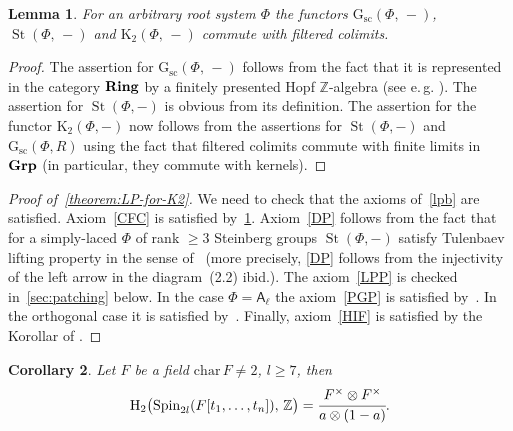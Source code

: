 \documentclass[oneside, 11pt]{amsart} \pdfoutput=1
\newcommand{\K}{{\mathrm{K}}}
\newcommand{\St}{\mathop{\mathrm{St}}\nolimits}
\newcommand{\Gsc}{\mathrm{G}_\mathrm{sc}}
\numberwithin{equation}{section}
\newtheorem{lemma}{Lemma} \numberwithin{lemma}{section}
\newtheorem{corollary}[lemma]{Corollary}
\theoremstyle{definition}
\newcommand{\ZZ}{\mathbb{Z}}
\newcommand{\rA}{\mathsf{A}}
\newcommand{\catname}[1]{{\normalfont\textbf{#1}}} %
\begin{document}
\begin{lemma} \label{k2cdc} 
For an arbitrary root system $\Phi$ the functors $\Gsc(\Phi,\,-)$, $\St(\Phi,\,-)$ and $\K_2(\Phi,\,-)$ commute with filtered colimits.
\end{lemma}
\begin{proof}
The assertion for $\mathrm G_{\mathrm{sc}}(\Phi,\,-)$ follows from the fact that it is represented in the category $\catname{Ring}$ by a finitely presented Hopf $\ZZ$-algebra (see e.\,g. \cite[Lemma~10.127.3]{stacks-project}). The assertion for $\St(\Phi, -)$ is obvious from its definition. The assertion for the functor $\K_2(\Phi, -)$ now follows from the assertions for $\St(\Phi, -)$ and $\Gsc(\Phi, R)$ using the fact that filtered colimits commute with finite limits in $\catname{Grp}$ (in particular, they commute with kernels).
\end{proof}

\begin{proof}[Proof of~\cref{theorem:LP-for-K2}]
We need to check that the axioms of~\cref{lpb} are satisfied. Axiom~\ref{CFC} is satisfied by~\cref{k2cdc}. Axiom~\ref{DP} follows from the fact that for a simply-laced $\Phi$ of rank $\geq 3$ Steinberg groups $\St(\Phi, -)$ satisfy Tulenbaev lifting property in the sense of~\cite[Definition~2.1]{LS17} (more precisely, \ref{DP} follows from the injectivity of the left arrow in the diagram~(2.2) ibid.).
The axiom~\ref{LPP} is checked in~\cref{sec:patching} below.
In the case $\Phi = \rA_\ell$ the axiom~\ref{PGP} is satisfied by~\cite[Theorem~5.1]{Tu83}. In the orthogonal case it is satisfied by~\cite[Theorem~1]{LS20}. Finally, axiom~\ref{HIF} is satisfied by the Korollar of \cite[Satz~1]{Re75}. \end{proof}

\begin{corollary}
Let $F$ be a field $\mathrm{char}\,F\neq2$, $l\geq7$, then
$$
\mathrm H_2\big(\mathrm{Spin}_{2l}(F[t_1,\ldots,t_n]),\,\mathbb Z\big)=\cfrac{F^\times\otimes F^\times}{a\otimes(1-a)}.
$$
\end{corollary}
\end{document}
